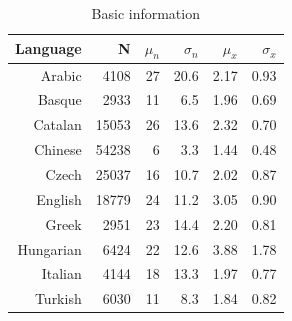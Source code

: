\documentclass[paper=a4, fontsize=11pt]{scrartcl} %
\begin{document}
\begin{table}[ht]
\centering
\begin{tabular}{rrrrrr}
  Language & N & $\mu_{n}$ & $\sigma_{n}$ & $\mu_{x}$ & $\sigma_{x}$ \\ 
  \midrule
Arabic & 4108 & 27 & 20.6 & 2.17 & 0.93 \\ 
  Basque & 2933 & 11 & 6.5 & 1.96 & 0.69 \\ 
  Catalan & 15053 & 26 & 13.6 & 2.32 & 0.70 \\ 
  Chinese & 54238 & 6 & 3.3 & 1.44 & 0.48 \\ 
  Czech & 25037 & 16 & 10.7 & 2.02 & 0.87 \\ 
  English & 18779 & 24 & 11.2 & 3.05 & 0.90 \\ 
  Greek & 2951 & 23 & 14.4 & 2.20 & 0.81 \\ 
  Hungarian & 6424 & 22 & 12.6 & 3.88 & 1.78 \\ 
  Italian & 4144 & 18 & 13.3 & 1.97 & 0.77 \\ 
  Turkish & 6030 & 11 & 8.3 & 1.84 & 0.82 \\ 
   \bottomrule
\end{tabular}
\caption{Basic information}
\label{tab:bi}
\end{table}
\end{document}
